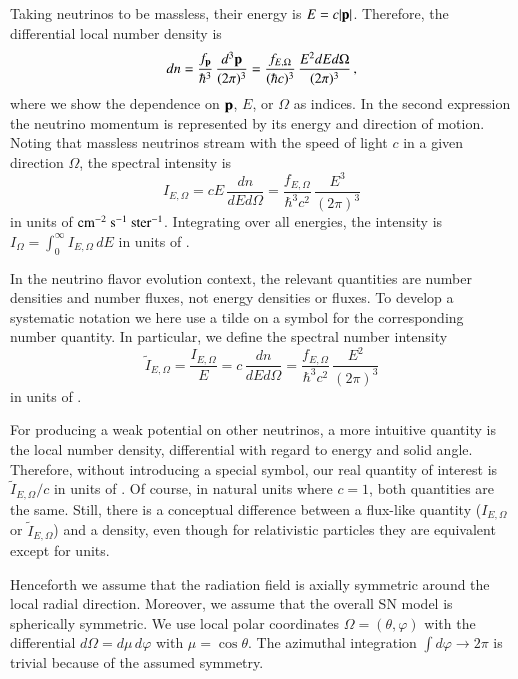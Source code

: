 \documentclass[iop,twocolappendix,numberedappendix]{emulateapj}
\begin{document}
Taking neutrinos to be massless, their energy is $E=c|{\bf p}|$. Therefore, the
differential local number density is
\begin{equation}
dn=\frac{f_{\bf p}}{\hbar^3}\,\frac{d^3{\bf p}}{(2\pi)^3}
=\frac{f_{E,\Omega}}{(\hbar c)^3}\,\frac{E^2dEd\Omega}{(2\pi)^3}\,,
\end{equation}
where we show the dependence on ${\bf p}$, $E$, or $\Omega$ as indices.
In the second expression the neutrino momentum is represented by
its energy and direction of motion.
Noting that massless neutrinos stream with the speed of light $c$ in a given
direction $\Omega$, the spectral intensity is
\begin{equation}
I_{E,\Omega}=c E\,\frac{dn}{dEd\Omega}=
\frac{f_{E,\Omega}}{\hbar^3 c^2}\,\frac{E^3}{(2\pi)^3}
\end{equation}
in units of ${\rm cm}^{-2}~{\rm s}^{-1}~{\rm ster}^{-1}$.
Integrating over all energies, the intensity is
$I_\Omega=\int_0^\infty I_{E,\Omega}\,dE$
in units of .

In the neutrino flavor evolution context, the relevant quantities are number
densities and number fluxes, not energy densities or fluxes. To develop a
systematic notation we here use a tilde on a symbol for the corresponding
number quantity. In particular, we define the spectral number intensity
\begin{equation}
\tilde I_{E,\Omega}=\frac{I_{E,\Omega}}{E}=c\,\frac{dn}{dEd\Omega}=
\frac{f_{E,\Omega}}{\hbar^3 c^2}\,\frac{E^2}{(2\pi)^3}
\end{equation}
in units of .

For producing a weak potential on other neutrinos, a more intuitive quantity
is the local number density, differential with regard to energy and solid angle.
Therefore, without introducing a
special symbol, our real quantity of interest is
$\tilde I_{E,\Omega}/c$
in units of . Of course,
in natural units where $c=1$, both quantities are the same. Still,
there is a conceptual difference between a flux-like quantity
($I_{E,\Omega}$ or $\tilde I_{E,\Omega}$)
and a density, even though for relativistic particles they are equivalent  except for units.

Henceforth we assume that the radiation field is axially symmetric around the
local radial direction. Moreover, we assume that the overall SN model is
spherically symmetric. We use local polar coordinates
$\Omega=(\theta,\varphi)$ with the differential $d\Omega=d\mu\,d\varphi$
with $\mu=\cos\theta$. The azimuthal integration $\int d\varphi\to2\pi$ is
trivial because of the assumed symmetry.
\end{document}
